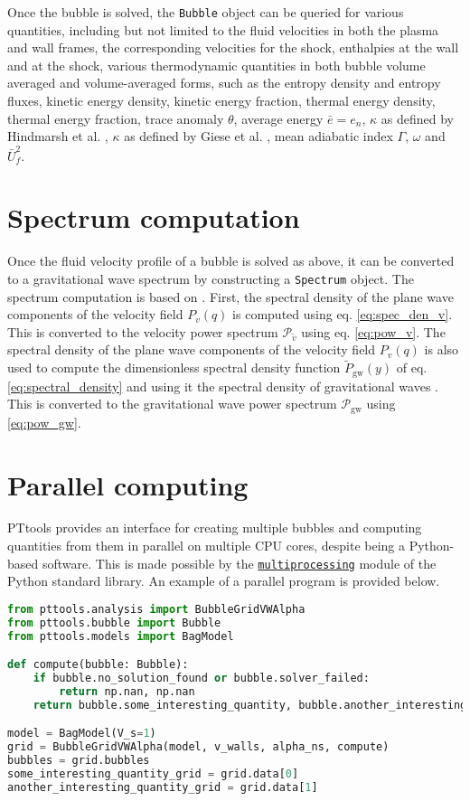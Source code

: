 Once the bubble is solved, the \verb|Bubble| object can be queried for various quantities,
including but not limited to the fluid velocities in both the plasma and wall frames,
the corresponding velocities for the shock,
enthalpies at the wall and at the shock,
various thermodynamic quantities in both bubble volume averaged and volume-averaged forms,
such as the entropy density and entropy fluxes,
kinetic energy density,
kinetic energy fraction,
thermal energy density,
thermal energy fraction,
trace anomaly $\theta$,
average energy $\bar{e} = e_n$,
$\kappa$ as defined by Hindmarsh et al. ,
$\kappa$ as defined by Giese et al. ,
mean adiabatic index $\Gamma$,
$\omega$ and
$\bar{U}_f^2$.


\section{Spectrum computation}
Once the fluid velocity profile of a bubble is solved as above,
it can be converted to a gravitational wave spectrum by constructing a \verb|Spectrum| object.
The spectrum computation is based on \cite{hindmarsh_gw_pt_2019}.
First, the spectral density of the plane wave components of the velocity field $P_v(q)$ is computed using eq. \eqref{eq:spec_den_v}.
This is converted to the velocity power spectrum $\mathcal{P}_{\tilde{v}}$ using eq. \eqref{eq:pow_v}.
The spectral density of the plane wave components of the velocity field $P_v(q)$ is also used to compute the dimensionless spectral density function $\tilde{P}_{\text{gw}}(y)$ of eq. \eqref{eq:spectral_density} and using it the spectral density of gravitational waves .
This is converted to the gravitational wave power spectrum $\mathcal{P}_{\text{gw}}$ using \eqref{eq:pow_gw}.


\section{Parallel computing}
PTtools provides an interface for creating multiple bubbles and computing quantities from them in parallel on multiple CPU cores,
despite being a Python-based software.
This is made possible by the
\href{https://docs.python.org/3/library/multiprocessing.html}{\texttt{multiprocessing}}
module of the Python standard library.
An example of a parallel program is provided below.

\begin{lstlisting}[language=Python]
from pttools.analysis import BubbleGridVWAlpha
from pttools.bubble import Bubble
from pttools.models import BagModel

def compute(bubble: Bubble):
	if bubble.no_solution_found or bubble.solver_failed:
		return np.nan, np.nan
	return bubble.some_interesting_quantity, bubble.another_interesting_quantity

model = BagModel(V_s=1)
grid = BubbleGridVWAlpha(model, v_walls, alpha_ns, compute)
bubbles = grid.bubbles
some_interesting_quantity_grid = grid.data[0]
another_interesting_quantity_grid = grid.data[1]
\end{lstlisting}
